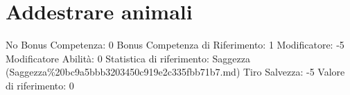 \section{Addestrare animali}\label{addestrare-animali}

\begin{description}
\tightlist
\item[Tags: ABI]
No Bonus Competenza: 0 Bonus Competenza di Riferimento: 1 Modificatore:
-5 Modificatore Abilità: 0 Statistica di riferimento: Saggezza
(Saggezza\%20bc9a5bbb3203450c919e2c335fbb71b7.md) Tiro Salvezza: -5
Valore di riferimento: 0
\end{description}
